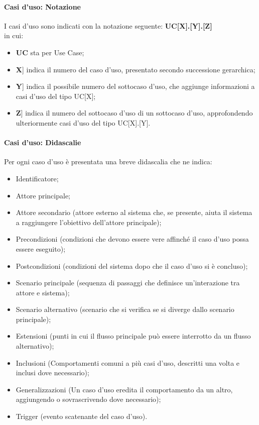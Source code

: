 \documentclass[10pt, a4paper]{article}
\begin{document}
\paragraph{Casi d'uso: Notazione\\}
I casi d'uso sono indicati con la notazione seguente: \textbf{UC[X].[Y].[Z]}\\
in cui:
\begin{itemize}
\item \textbf{UC} sta per Use Case;
\item \lbrack \textbf{X}] indica il numero del caso d'uso, presentato secondo successione gerarchica;
\item \lbrack \textbf{Y}] indica il possibile numero del sottocaso d'uso, che aggiunge informazioni a casi d'uso del tipo UC[X];
\item \lbrack \textbf{Z}] indica il numero del sottocaso d'uso di un sottocaso d'uso, approfondendo ulteriormente casi d'uso del tipo UC[X].[Y].
\end{itemize}

\paragraph{Casi d'uso: Didascalie\\}
Per ogni caso d'uso è presentata una breve didascalia che ne indica:
\begin{itemize}
    \item Identificatore;
    \item Attore principale;
    \item Attore secondario (attore esterno al sistema che, se presente, aiuta il sistema a raggiungere l'obiettivo dell'attore principale);
    \item Precondizioni (condizioni che devono essere vere affinché il caso d'uso possa essere eseguito);
    \item Postcondizioni (condizioni del sistema dopo che il caso d'uso si è concluso);
    \item Scenario principale (sequenza di passaggi che definisce un'interazione tra attore e sistema);
    \item Scenario alternativo (scenario che si verifica se si diverge dallo scenario principale);
    \item Estensioni (punti in cui il flusso principale può essere interrotto da un flusso alternativo);
    \item Inclusioni (Comportamenti comuni a più casi d’uso, descritti una volta e inclusi dove necessario);
    \item Generalizzazioni (Un caso d’uso eredita il comportamento da un altro, aggiungendo o sovrascrivendo dove necessario);
    \item Trigger (evento scatenante del caso d'uso).
\end{itemize}
\end{document}
